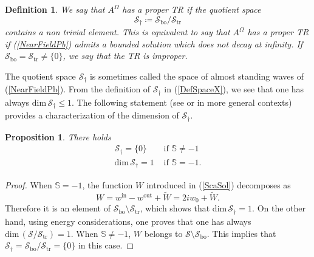 \documentclass[11pt,a4paper]{article}
\newcommand{\Om}{\Omega}
\newcommand{\mrm}[1]{\mathrm{#1}}
\newcommand{\mX}{\mathscr{S}}
\renewcommand{\dim}{\mrm{dim}}
\newtheorem{definition}[theorem]{Definition}
\newtheorem{proposition}[theorem]{Proposition}
\begin{document}
\begin{definition}
We say that $A^{\Om}$ has a proper TR if the quotient space
\[
\mX_{\dagger}\coloneqq\mX_{\mrm{bo}}/\mX_{\mrm{tr}}
\]
contains a non trivial element. This is equivalent to say that $A^{\Om}$ has a proper TR if (\ref{NearFieldPb}) admits a bounded solution which does not decay at infinity. If $\mX_{\mrm{bo}}=\mX_{\mrm{tr}}\ne\{0\}$, we say that the TR is improper. 
\end{definition}
\noindent The quotient space $\mX_{\dagger}$ is sometimes called the space of almost standing waves of (\ref{NearFieldPb}). 
From the definition of $\mX_{\dagger}$ in  (\ref{DefSpaceX}), we see that one has always $\dim\,\mX_{\dagger}\le1$. The following statement (see \cite[Thm.\,7.1]{Naza16} or \cite{Naza14} in more general contexts) provides a characterization of the dimension of $\mX_{\dagger}$. 
\begin{proposition}\label{PropoCharacterisation}
There holds
\[
\begin{array}{|ll}
\mX_{\dagger}=\{0\}&\mbox{ if }\mathbb{S}\ne-1\\[2pt]
\dim\,\mX_{\dagger}=1 &\mbox{ if }\mathbb{S}=-1.
\end{array}
\]
\end{proposition}
\begin{proof}
When $\mathbb{S}=-1$, the function $W$ introduced in (\ref{ScaSol}) decomposes as
\begin{equation}\label{ProofBounded}
W  = w^{\mrm{in}}-w^{\mrm{out}}+\widetilde{W}=2iw_0+\widetilde{W}.
\end{equation}
Therefore it is an element of $\mX_{\mrm{bo}}\setminus\mX_{\mrm{tr}}$, which shows that $\dim\,\mX_{\dagger}=1$. On the other hand, using energy considerations, one proves that one has always $\dim\,(\mX/\mX_{\mrm{tr}})=1$. When $\mathbb{S}\ne-1$, $W$ belongs to $\mX\setminus\mX_{\mrm{bo}}$. This implies that $\mX_{\dagger}=\mX_{\mrm{bo}}/\mX_{\mrm{tr}}=\{0\}$ in this case. 
\end{proof}
\end{document}
